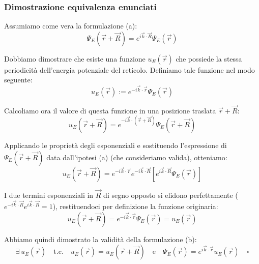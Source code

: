 \subsubsection{Dimostrazione equivalenza enunciati}

Assumiamo come vera la formulazione (a):
\begin{equation}
    \Psi_E(\vec{r} + \vec{R}) = e^{i\vec{k}\cdot\vec{R}} \Psi_E(\vec{r})
\end{equation}

Dobbiamo dimostrare che esiste una funzione \(u_E(\vec{r})\) che possiede la stessa periodicità dell'energia potenziale del reticolo. Definiamo tale funzione nel modo seguente:
\begin{equation}
    u_E(\vec{r}) := e^{-i\vec{k}\cdot\vec{r}} \Psi_E(\vec{r})
\end{equation}

Calcoliamo ora il valore di questa funzione in una posizione traslata \(\vec{r} + \vec{R}\):
\begin{equation}
    u_E(\vec{r} + \vec{R}) = e^{-i\vec{k}\cdot(\vec{r} + \vec{R})} \Psi_E(\vec{r} + \vec{R})
\end{equation}

Applicando le proprietà degli esponenziali e sostituendo l'espressione di \(\Psi_E(\vec{r} + \vec{R})\) data dall'ipotesi (a) (che consideriamo valida), otteniamo:
\begin{equation}
    u_E(\vec{r} + \vec{R}) = e^{-i\vec{k}\cdot\vec{r}} e^{-i\vec{k}\cdot\vec{R}} \left[ e^{i\vec{k}\cdot\vec{R}} \Psi_E(\vec{r}) \right]
\end{equation}

I due termini esponenziali in \(\vec{R}\) di segno opposto si elidono perfettamente (\(e^{-i\vec{k}\cdot\vec{R}} e^{i\vec{k}\cdot\vec{R}} = 1\)), restituendoci per definizione la funzione originaria:
\begin{equation}
    u_E(\vec{r} + \vec{R}) = e^{-i\vec{k}\cdot\vec{r}} \Psi_E(\vec{r}) = u_E(\vec{r})
\end{equation}

Abbiamo quindi dimostrato la validità della formulazione (b):
\begin{equation}
    \exists \, u_E(\vec{r}) \quad \text{t.c.} \quad u_E(\vec{r}) = u_E(\vec{r} + \vec{R}) \quad \text{e} \quad \Psi_E(\vec{r}) = e^{i\vec{k}\cdot\vec{r}} u_E(\vec{r}) \quad \square
\end{equation}

\vspace{0.5cm}

